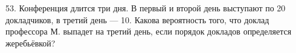53. Конференция длится три дня. В первый и второй день выступают по 20 докладчиков, в третий день --- 10. Какова вероятность того, что доклад профессора М. выпадет на третий день, если порядок докладов определяется жеребьёвкой?\\
